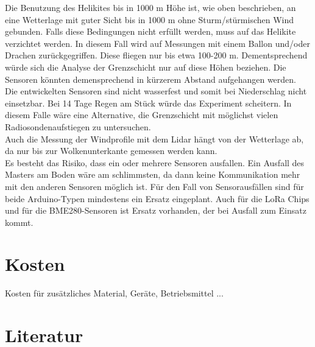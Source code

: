 \documentclass[a4paper,11pt,DIV=calc,tablecaptionabove,headinclude,twoside]{article}
\begin{document}
Die Benutzung des Helikites bis in 1000 m Höhe ist, wie oben beschrieben, an eine
Wetterlage mit guter Sicht bis in 1000 m ohne Sturm/stürmischen Wind gebunden. Falls diese Bedingungen nicht erfüllt werden, muss
auf das Helikite verzichtet werden. In diesem Fall wird auf Messungen mit einem Ballon und/oder Drachen 
zurückgegriffen. Diese fliegen nur bis etwa 100-200 m. Dementsprechend würde sich die Analyse der Grenzschicht 
nur auf diese Höhen beziehen. Die Sensoren könnten demensprechend in kürzerem Abstand aufgehangen werden.\\
Die entwickelten Sensoren sind nicht wasserfest und somit bei Niederschlag nicht einsetzbar. Bei 14 Tage Regen am Stück
würde das Experiment scheitern. In diesem Falle wäre eine Alternative, die Grenzschicht mit möglichst vielen Radiosondenaufstiegen
zu untersuchen. \\
Auch die Messung der Windprofile mit dem Lidar hängt von der Wetterlage ab, da nur bis zur Wolkenunterkante gemessen werden kann. \\
Es besteht das Risiko, dass ein oder mehrere Sensoren ausfallen. Ein Ausfall des Masters am Boden wäre am
schlimmsten, da dann keine Kommunikation mehr mit den anderen Sensoren möglich ist. Für den Fall von 
Sensorausfällen sind für beide Arduino-Typen mindestens ein Ersatz eingeplant. Auch für die LoRa Chips und für
die BME280-Sensoren ist Ersatz vorhanden, der bei Ausfall zum Einsatz kommt.\\

\section{Kosten}
Kosten für zusätzliches Material, Geräte, Betriebsmittel ...

\section*{Literatur}

\end{document}
